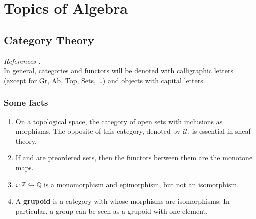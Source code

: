 \part{Topics of Algebra}


\chapter{Category Theory}

\textit{References \cite{adamekAbstractConcreteCategories2004,richterCategoriesHomotopyTheory2020}.}\\ %
In general, categories and functors will be denoted with calligraphic letters (except for Gr, Ab, Top, Sets, \dots) and objects with capital letters.\\

\section{Some facts}  

\begin{example}
    \begin{enumerate}
        \item On a topological space, the category of open sets with inclusions as morphisms. The opposite of this category, denoted by $\mathcal{U}$, is essential in sheaf theory.
        \item If \ca and \cb are preordered sets, then the functors between them are the monotone maps.
        \item $i: \mathbb{Z} \hookrightarrow \mathbb{Q}$ is a monomorphism and epimorphism, but not an isomorphism.
        \item A \textbf{grupoid} is a category with whose morphisms are isomorphisms. In particular, a group can be seen as a grupoid with one element.
    \end{enumerate}
\end{example}
\medspace


